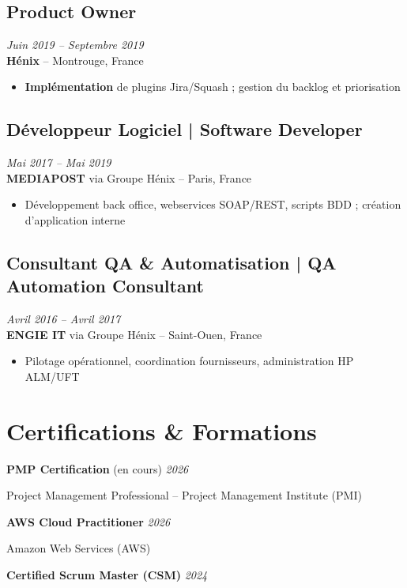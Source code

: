 \documentclass[11pt,a4paper]{article}
\begin{document}
\subsection*{Product Owner} \hfill \textit{Juin 2019 -- Septembre 2019}\\
\textbf{Hénix} -- Montrouge, France
\begin{itemize}
    \item \textbf{Implémentation} de plugins Jira/Squash ; gestion du backlog et priorisation
\end{itemize}

\subsection*{Développeur Logiciel | Software Developer} \hfill \textit{Mai 2017 -- Mai 2019}\\
\textbf{MEDIAPOST} via Groupe Hénix -- Paris, France
\begin{itemize}
    \item Développement back office, webservices SOAP/REST, scripts BDD ; création d'application interne
\end{itemize}

\subsection*{Consultant QA \& Automatisation | QA Automation Consultant} \hfill \textit{Avril 2016 -- Avril 2017}\\
\textbf{ENGIE IT} via Groupe Hénix -- Saint-Ouen, France
\begin{itemize}
    \item Pilotage opérationnel, coordination fournisseurs, administration HP ALM/UFT
\end{itemize}

\section*{Certifications \& Formations}

\textbf{PMP Certification} (en cours) \hfill \textit{2026}

Project Management Professional -- Project Management Institute (PMI)

\textbf{AWS Cloud Practitioner} \hfill \textit{2026}

Amazon Web Services (AWS)

\textbf{Certified Scrum Master (CSM)} \hfill \textit{2024}
\end{document}
